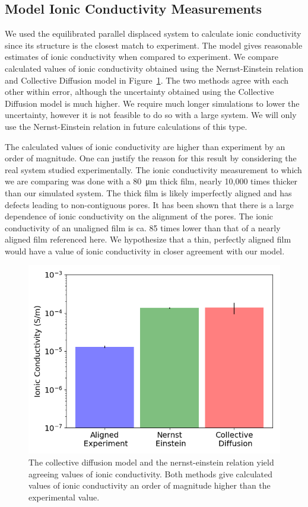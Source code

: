 \documentclass{article}
\begin{document}
  \subsection{Model Ionic Conductivity Measurements}

  We used the equilibrated parallel displaced system to calculate ionic
  conductivity since its structure is the closest match to experiment. The model
  gives reasonable estimates of ionic conductivity when compared to experiment.
  We compare calculated values of ionic conductivity obtained using the
  Nernst-Einstein relation and Collective Diffusion model in
  Figure~\ref{fig:conductivity}. The two methods agree with each other within
  error, although the uncertainty obtained using the Collective Diffusion model
  is much higher. We require much longer simulations to lower the uncertainty,
  however it is not feasible to do so with a large system. We will only use the
  Nernst-Einstein relation in future calculations of this type. 

  The calculated values of ionic conductivity are higher than experiment by an
  order of magnitude. One can justify the reason for this result by considering
  the real system studied experimentally. The ionic conductivity measurement to
  which we are comparing was done with a \SI{80}{\micro\metre} thick film, nearly
  10,000 times thicker than our simulated system. The thick film is likely
  imperfectly aligned and has defects leading to non-contiguous pores. It has
  been shown that there is a large dependence of ionic conductivity on the
  alignment of the pores. The ionic conductivity of an unaligned film is ca. 85
  times lower than that of a nearly aligned film referenced here. We hypothesize
  that a thin, perfectly aligned film would have a value of ionic conductivity in
  closer agreement with our model.
 
  \begin{figure}
        \centering
        \includegraphics[width=0.5\linewidth]{IC_offset.png}
        \caption{The collective diffusion model and the nernst-einstein relation yield
        agreeing values of ionic conductivity. Both methods give calculated
        values of ionic conductivity an order of magnitude higher than the experimental
        value.}
        \label{fig:conductivity}
  \end{figure}
\end{document}
